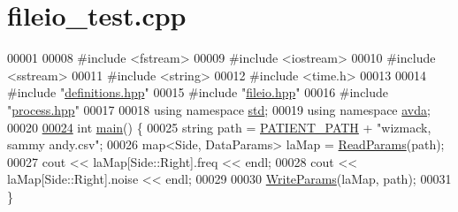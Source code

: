 \hypertarget{fileio__test_8cpp_source}{\section{fileio\+\_\+test.\+cpp}
\label{fileio__test_8cpp_source}
}

\begin{DoxyCode}
00001 
00008 \textcolor{preprocessor}{#include <fstream>}
00009 \textcolor{preprocessor}{#include <iostream>}
00010 \textcolor{preprocessor}{#include <sstream>}
00011 \textcolor{preprocessor}{#include <string>}
00012 \textcolor{preprocessor}{#include <time.h>}
00013 
00014 \textcolor{preprocessor}{#include "\hyperlink{definitions_8hpp}{definitions.hpp}"}
00015 \textcolor{preprocessor}{#include "\hyperlink{fileio_8hpp}{fileio.hpp}"}
00016 \textcolor{preprocessor}{#include "\hyperlink{process_8hpp}{process.hpp}"}
00017 
00018 \textcolor{keyword}{using namespace }\hyperlink{namespacestd}{std};
00019 \textcolor{keyword}{using namespace }\hyperlink{namespaceavda}{avda};
00020 
\hypertarget{fileio__test_8cpp_source_l00024}{}\hyperlink{fileio__test_8cpp_ae66f6b31b5ad750f1fe042a706a4e3d4}{00024} \textcolor{keywordtype}{int} \hyperlink{fileio__test_8cpp_ae66f6b31b5ad750f1fe042a706a4e3d4}{main}() \{
00025     \textcolor{keywordtype}{string} path = \hyperlink{namespaceavda_a8ee73ec0cb55d4a13e89949764dce89d}{PATIENT\_PATH} + \textcolor{stringliteral}{"wizmack, sammy andy.csv"};
00026     map<Side, DataParams> laMap = \hyperlink{namespaceavda_a46dc980b65ddfc24749ce25c1290e158}{ReadParams}(path);
00027     cout <<  laMap[Side::Right].freq << endl;
00028     cout << laMap[Side::Right].noise << endl;
00029 
00030     \hyperlink{namespaceavda_aba04a08b41833ced32ec803d55a63bee}{WriteParams}(laMap, path);
00031 \}
\end{DoxyCode}
